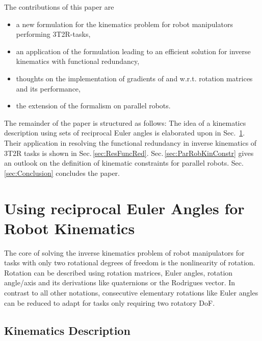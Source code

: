 \documentclass[twocolumn,10pt]{IFTOMM}
\begin{document}
The contributions of this paper are
\begin{itemize}
    \item a new formulation for the kinematics problem for robot manipulators performing 3T2R-tasks,
    \item an application of the formulation leading to an efficient solution for inverse kinematics with functional redundancy,
    \item thoughts on the implementation of gradients of and w.r.t. rotation matrices and its performance,
    \item the extension of the formalism on parallel robots.
\end{itemize}

The remainder of the paper is structured as follows: The idea of a kinematics description using sets of reciprocal Euler angles is elaborated upon in Sec.\, \ref{sec:RecEulAng}.
Their application in resolving the functional redundancy in inverse kinematics of 3T2R tasks is shown in Sec.\,\ref{sec:ResFuncRed}.
Sec.\,\ref{sec:ParRobKinConstr} gives an outlook on the definition of kinematic constraints for parallel robots. 
Sec.\,\ref{sec:Conclusion} concludes the paper.

\section{Using reciprocal Euler Angles for Robot Kinematics}
\label{sec:RecEulAng}

The core of solving the inverse kinematics problem of robot manipulators for tasks with only two rotational degrees of freedom is the nonlinearity of rotation.
Rotation can be described using rotation matrices, Euler angles, rotation angle/axis and its derivations like quaternions or the Rodrigues vector.
In contrast to all other notations, consecutive elementary rotations like Euler angles can be reduced to adapt for tasks only requiring two rotatory DoF.

\subsection{Kinematics Description}
\label{sec:RecEulAng_KinDesc}
\end{document}

